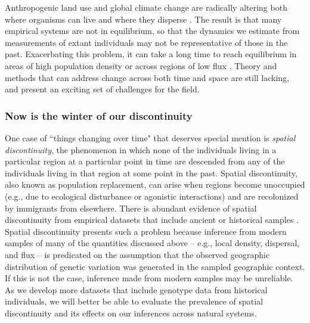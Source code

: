 \documentclass{ar-1col}
\newcommand{\plr}[1]{{\color{green}{#1}}}
\renewcommand{\emph}[1]{{\textit{#1}}}
\begin{document}
Anthropogenic land use
and global climate change
are radically altering both where organisms can live
and where they disperse \citep{parmesan1999}.
The result is that many empirical systems
are not in equilibrium,
so that the dynamics we estimate from
measurements of extant individuals may
not be representative of those in the past.
Exacerbating this problem,
it can take a long time to reach equilibrium
in areas of high population density
or across regions of low flux
\citep{CrowAoki1984group, whitlock1992temporal, slatkin1993isolation, WhitlockMcCauley1999}.
Theory and methods that can address change across both time and space
are still lacking,
and present an exciting set of challenges for the field.

\subsubsection{Now is the winter of our discontinuity}
\plr{shorten this up, I think, and call it something besides discontinuity? I have not heard this, and connotes other things to me.}

One case of ``things changing over time" that deserves special mention 
is \emph{spatial discontinuity}, 
the phenomenon in which none of the individuals 
living in a particular region at a particular point in time 
are descended from any of the individuals living in that region 
at some point in the past.
Spatial discontinuity, 
also known as population replacement, 
can arise when regions become unoccupied
(e.g., due to ecological disturbance or agonistic interactions) 
and are recolonized by immigrants from elsewhere. 
There is abundant evidence of spatial discontinuity 
from empirical datasets that include ancient or historical samples 
\citep{bi2013unlocking, skoglund2014investigating, PickrellReich2014, lazaridis_ancient_2014, haak2015massive, allentoft2015population, joseph2018inference}.
Spatial discontinuity presents such a problem because 
inference from modern samples of many of the quantities discussed above --  
e.g., local density, dispersal, and flux --
is predicated on the assumption that 
the observed geographic distribution of genetic variation 
was generated in the sampled geographic context.
If this is not the case,
inference made from modern samples may be unreliable.
As we develop more datasets that include genotype data from historical individuals, 
we will better be able to evaluate the prevalence of spatial discontinuity 
and its effects on our inferences across natural systems. 
\end{document}
